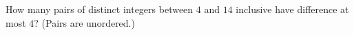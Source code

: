 How many pairs of distinct integers between $4$ and $14$ inclusive have difference at most $4$? (Pairs are unordered.)
